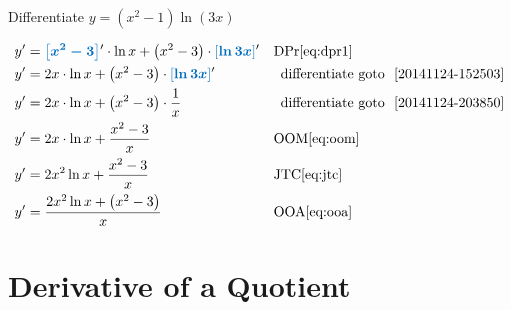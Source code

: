 \documentclass[20150903-160354-rs2.2-MarksMathNotebook.tex]{subfiles}
\begin{document}
\begin{example}[id:20141124-205219] \label{20141124-205219} \hfill \\

Differentiate $y=\left(x^2-1 \right) \ln(3x)$

\soln

\solnsteps
\begin{align*}
y' &= \farg{x^2-3}' \cdot \ln x + \left(x^2-3\right) \cdot \farg{\ln 3x}' && \text{DPr} \eqref{eq:dpr1} \\
y' &= 2x \cdot \ln x + \left(x^2-3\right) \cdot \farg{\ln 3x}' &&  \text{\, differentiate goto \,} \, \ref{20141124-152503} \\
y' &= 2x \cdot \ln x + \left(x^2-3\right) \cdot \dfrac{1}{x}  && \text{\, differentiate goto \,} \, \ref{20141124-203850}\\
y' &= 2x \cdot \ln x + \dfrac{x^2-3}{x} && \text{OOM} \eqref{eq:oom} \\
y' &= 2x^2 \ln x +\dfrac{x^2-3}{x} && \text{JTC} \eqref{eq:jtc} \\
y' &= \dfrac{2x^2 \ln x + \left(x^2-3\right)}{x} && \text{OOA} \eqref{eq:ooa}
\end{align*}
\end{example}



\section{Derivative of a Quotient}\label{Derivative of a Quotient}
\end{document}
